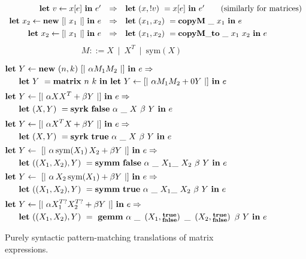 \begin{figure}[t]
\begin{center}
\[\def\arraystretch{1.3}
    \begin{array}{rcl}
    \Let\ v \leftarrow x[e]\ \In\ e' &
    \Rightarrow &
    \Let\ (x, !v)\ = x[e]\ \In\ e' \qquad \textrm{(similarly for matrices)}
\\
    \Let\ x_2 \leftarrow \ottkw{new}\ [|\ x_1\ |]\ \In\ e &
    \Rightarrow &
    \Let\ (x_1, x_2)\ = \ottkw{copyM}\ \_\ x_1\ \In\ e
\\
    \Let\ x_2 \leftarrow [|\ x_1\ |]\ \In\ e &
    \Rightarrow &
    \Let\ (x_1, x_2)\ = \ottkw{copyM\_to}\ \_\ x_1\ x_2\ \In\ e
    \end{array}
\]
\[
    M ::= X\ \mid\ X^T\ \mid\ \textrm{sym}( X )
\]
\end{center}
\begin{align*}
    \mathbf{let}\ &Y \leftarrow \mathbf{new}\ (n, k)\ [|\ \alpha M_1 M_2 \ |]\ \mathbf{in}\ e
    \Rightarrow \\
    & \mathbf{let}\ Y\ = \mathbf{matrix}\ n\ k\ \mathbf{in}
    \ \mathbf{let}\ Y \leftarrow [|\ \alpha M_1 M_2 + 0Y\ |]\ \mathbf{in}\ e
\\[0.1\baselineskip]
    \mathbf{let}\ &Y \leftarrow [|\ \alpha X X^T + \beta Y\ |]\ \mathbf{in}\ e
    \Rightarrow \\
    & \mathbf{let}\ (X,Y)\ = \mathbf{syrk}\ \mathbf{false}
    \ \alpha\ \_\ X\ \beta\ Y\ \mathbf{in}\ e
\\[0.1\baselineskip]
    \mathbf{let}\ &Y \leftarrow [|\ \alpha X^T X + \beta Y\ |]\ \mathbf{in}\ e
    \Rightarrow \\
    & \mathbf{let}\ (X,Y)\ = \mathbf{syrk}\ \mathbf{true}
    \ \alpha\ \_\ X\ \beta\ Y\ \mathbf{in}\ e
\\[0.1\baselineskip]
    \mathbf{let}\ &Y \leftarrow\ [|\ \alpha\,\textrm{sym}(X_1)\,X_2 + \beta Y\ |]\ \mathbf{in}\ e
    \Rightarrow \\
    & \mathbf{let}\ ((X_1,X_2),Y)\ = \mathbf{symm}\ \mathbf{false}
        \ \alpha\ \_ \ X_1 \_\ X_2\ \beta\ Y\ \mathbf{in}\ e
\\[0.1\baselineskip]
    \mathbf{let}\ &Y \leftarrow\ [|\ \alpha\,X_2\,\textrm{sym}(X_1) + \beta Y\ |]\ \mathbf{in}\ e
    \Rightarrow \\
    & \mathbf{let}\ ((X_1,X_2),Y)\ = \mathbf{symm}\ \mathbf{true}
        \ \alpha\ \_ \ X_1 \_\ X_2\ \beta\ Y\ \mathbf{in}\ e
\\[0.1\baselineskip]
    \mathbf{let}\ &Y \leftarrow [|\ \alpha X_1^{T?} X_2^{T?} + \beta Y\ |]\ \mathbf{in}\ e
    \Rightarrow \\
    & \mathbf{let}\ ((X_1,X_2),Y)\ =\ \mathbf{gemm}\ \alpha
        \ \_\ \left(X_1, \substack{\mathbf{true}\\\mathbf{false}}\right)
        \ \_\ \left(X_2, \substack{\mathbf{true}\\\mathbf{false}}\right)
        \ \beta\ Y\ \mathbf{in}\ e
\end{align*}

\caption{Purely syntactic pattern-matching translations of
    matrix expressions.}\label{fig:lang_matexp}
\end{figure}

